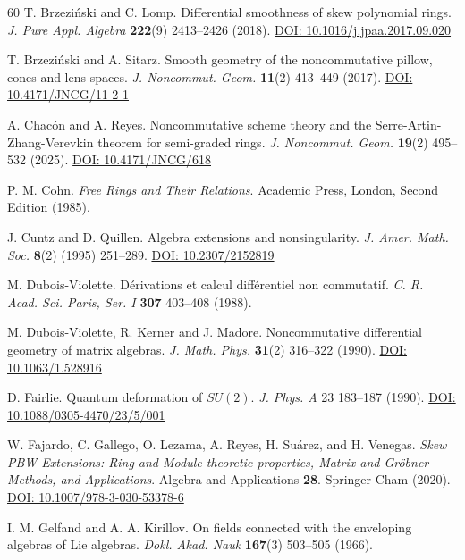 \documentclass{amsart}
\theoremstyle{definition}
\theoremstyle{remark}
\numberwithin{equation}{section}
\begin{document}
\begin{thebibliography}{60}
 T. Brzezi{\'n}ski and C. Lomp. Differential smoothness of skew polynomial rings. {\em J. Pure Appl. Algebra} {\bf 222}(9) 2413--2426 (2018). \href{https://doi.org/10.1016/j.jpaa.2017.09.020}{DOI: 10.1016/j.jpaa.2017.09.020}

T. Brzezi{\'n}ski and A. Sitarz. Smooth geometry of the noncommutative pillow, cones and lens spaces. {\em J. Noncommut. Geom.} {\bf 11}(2) 413--449 (2017). \href{https://doi.org/10.4171/JNCG/11-2-1}{DOI: 10.4171/JNCG/11-2-1}

 A. Chac\'on and A. Reyes. Noncommutative scheme theory and the Serre-Artin-Zhang-Verevkin theorem for semi-graded rings. {\em J. Noncommut. Geom.} {\bf 19}(2) 495--532 (2025). \href{https://doi.org/10.4171/JNCG/618}{DOI: 10.4171/JNCG/618}

 P. M. Cohn. {\em Free Rings and Their Relations}. Academic Press, London, Second Edition (1985). 

 J. Cuntz and D. Quillen. Algebra extensions and nonsingularity. {\em J. Amer. Math. Soc.} {\bf 8}(2) (1995) 251--289. \href{https://www.ams.org/journals/jams/1995-08-02/S0894-0347-1995-1303029-0/}{DOI: 10.2307/2152819}

 M. Dubois-Violette. D\'erivations et calcul diff\'erentiel non commutatif. {\em C. R. Acad. Sci. Paris, Ser. I} {\bf 307} 403--408 (1988).

 M. Dubois-Violette, R. Kerner and J. Madore. Noncommutative differential geometry of matrix algebras. {\em J. Math. Phys.} {\bf 31}(2) 316--322 (1990). \href{https://doi.org/10.1063/1.528916}{DOI: 10.1063/1.528916}

 D. Fairlie. Quantum deformation of $SU(2)$. {\em J. Phys. A} 23 183--187 (1990). \href{https://iopscience.iop.org/article/10.1088/0305-4470/23/5/001}{DOI: 10.1088/0305-4470/23/5/001}

 W. Fajardo, C. Gallego, O.  Lezama, A. Reyes, H. Su\'arez, and H. Venegas. {\em Skew PBW Extensions: Ring and Module-theoretic properties, Matrix and Gr\"obner Methods, and Applications}. Algebra and Applications {\bf 28}. Springer Cham (2020). \href{https://doi.org/10.1007/978-3-030-53378-6}{DOI: 10.1007/978-3-030-53378-6}

 I. M. Gelfand and A. A. Kirillov. On fields connected with the enveloping algebras of Lie algebras. {\em Dokl. Akad. Nauk} {\bf 167}(3) 503--505 (1966).


\end{thebibliography}
\end{document}
